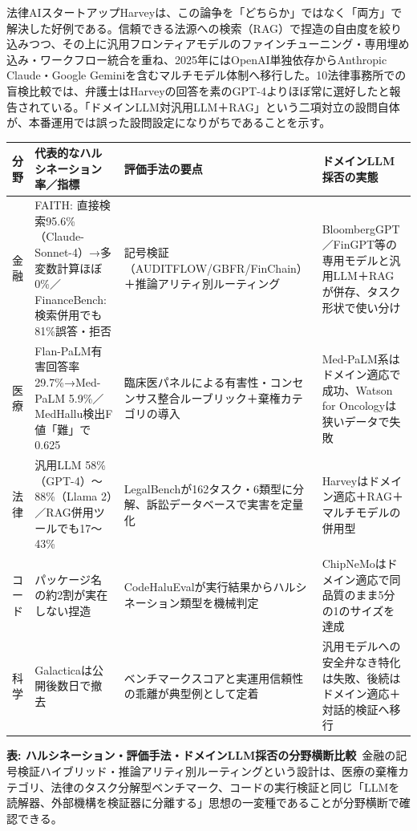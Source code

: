 法律AIスタートアップHarveyは、この論争を「どちらか」ではなく「両方」で解決した好例である。信頼できる法源への検索（RAG）で捏造の自由度を絞り込みつつ、その上に汎用フロンティアモデルのファインチューニング・専用埋め込み・ワークフロー統合を重ね、2025年にはOpenAI単独依存からAnthropic Claude・Google Geminiを含むマルチモデル体制へ移行した。10法律事務所での盲検比較では、弁護士はHarveyの回答を素のGPT-4よりほぼ常に選好したと報告されている\cite{y05harvey2025}。「ドメインLLM対汎用LLM＋RAG」という二項対立の設問自体が、本番運用では誤った設問設定になりがちであることを示す。

\begin{center}
\footnotesize
\renewcommand{\arraystretch}{1.3}
\begin{tabular}{@{}p{2.0cm}p{4.0cm}p{3.4cm}p{3.7cm}@{}}
\toprule
\textbf{分野} & \textbf{代表的なハルシネーション率／指標} & \textbf{評価手法の要点} & \textbf{ドメインLLM採否の実態} \\
\midrule
金融 & FAITH: 直接検索95.6\%（Claude-Sonnet-4）→多変数計算ほぼ0\%\cite{x05faith2025}／FinanceBench: 検索併用でも81\%誤答・拒否\cite{financebench2023} & 記号検証（AUDITFLOW/GBFR/FinChain）＋推論アリティ別ルーティング\cite{x05finchain2025,x05gbfr2026} & BloombergGPT／FinGPT等の専用モデルと汎用LLM＋RAGが併存、タスク形状で使い分け \\
医療 & Flan-PaLM有害回答率29.7\%→Med-PaLM 5.9\%\cite{y05medpalm2_2025}／MedHallu検出F値「難」で0.625\cite{y05medhallu2025} & 臨床医パネルによる有害性・コンセンサス整合ルーブリック＋棄権カテゴリの導入 & Med-PaLM系はドメイン適応で成功、Watson for Oncologyは狭いデータで失敗\cite{y05watsononcology2018} \\
法律 & 汎用LLM 58\%（GPT-4）〜88\%（Llama 2）\cite{y05dahl2024legalfictions}／RAG併用ツールでも17〜43\%\cite{y05magesh2025hallucinationfree} & LegalBenchが162タスク・6類型に分解\cite{y05legalbench2023}、訴訟データベースで実害を定量化\cite{y05charlotin2026database} & Harveyはドメイン適応＋RAG＋マルチモデルの併用型\cite{y05harvey2025} \\
コード & パッケージ名の約2割が実在しない捏造 & CodeHaluEvalが実行結果からハルシネーション類型を機械判定\cite{y05codehalu2024} & ChipNeMoはドメイン適応で同品質のまま5分の1のサイズを達成\cite{y05chipnemo2023} \\
科学 & Galacticaは公開後数日で撤去\cite{y05galactica2022} & ベンチマークスコアと実運用信頼性の乖離が典型例として定着 & 汎用モデルへの安全弁なき特化は失敗、後続はドメイン適応＋対話的検証へ移行 \\
\bottomrule
\end{tabular}
\end{center}
{\small\color{brandgray}\textbf{表: ハルシネーション・評価手法・ドメインLLM採否の分野横断比較}\ 金融の記号検証ハイブリッド・推論アリティ別ルーティングという設計は、医療の棄権カテゴリ、法律のタスク分解型ベンチマーク、コードの実行検証と同じ「LLMを読解器、外部機構を検証器に分離する」思想の一変種であることが分野横断で確認できる。}

